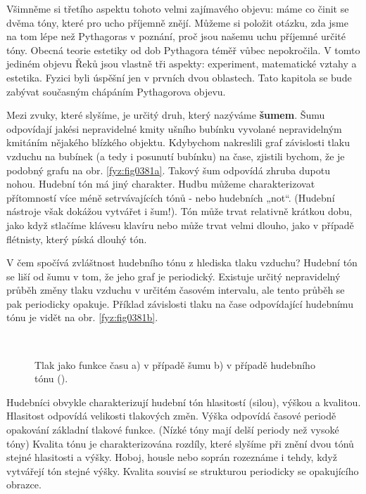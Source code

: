   Všimněme si třetího aspektu tohoto velmi zajímavého objevu: máme co činit se dvěma tóny, které 
  pro ucho příjemně znějí. Můžeme si položit otázku, zda jsme na tom lépe než Pythagoras v 
  poznání, proč jsou našemu uchu příjemné určité tóny. Obecná teorie estetiky od dob Pythagora 
  téměř vůbec nepokročila. V tomto jediném objevu Řeků jsou vlastně tři aspekty: experiment, 
  matematické vztahy a estetika. Fyzici byli úspěšní jen v prvních dvou oblastech. Tato kapitola 
  se bude zabývat současným chápáním Pythagorova objevu. 
    
  Mezi zvuky, které slyšíme, je určitý druh, který nazýváme \textbf{šumem}. Šumu odpovídají 
  jakési nepravidelné kmity ušního bubínku vyvolané nepravidelným kmitáním nějakého blízkého 
  objektu. Kdybychom nakreslili graf závislosti tlaku vzduchu na bubínek (a tedy i posunutí 
  bubínku) na čase, zjistili bychom, že je podobný grafu na obr. \ref{fyz:fig0381a}. Takový šum 
  odpovídá zhruba dupotu nohou. Hudební tón má jiný charakter. Hudbu můžeme charakterizovat 
  přítomností více méně setrvávajících tónů - nebo hudebních „not“. (Hudební nástroje však dokážou 
  vytvářet i šum!). Tón může trvat relativně krátkou dobu, jako když stlačíme klávesu klavíru nebo 
  může trvat velmi dlouho, jako v případě flétnisty, který píská dlouhý tón. 
    
  V čem spočívá zvláštnost hudebního tónu z hlediska tlaku vzduchu? Hudební tón se liší od šumu v 
  tom, že jeho graf je periodický. Existuje určitý nepravidelný průběh změny tlaku vzduchu v 
  určitém časovém intervalu, ale tento průběh se pak periodicky opakuje. Příklad závislosti tlaku 
  na čase odpovídající hudebnímu tónu je vidět na obr. \ref{fyz:fig0381b}.

  \begin{figure}[ht!] %
    \centering
     \\
    \caption{Tlak jako funkce času a) v případě šumu b) v případě hudebního tónu
             (\cite[s.~673]{Feynman01}).}
    \label{fyz:fig0381}
  \end{figure}
  
  Hudebníci obvykle charakterizují hudební tón hlasitostí (silou), výškou a kvalitou. Hlasitost 
  odpovídá velikosti tlakových změn. Výška odpovídá časové periodě opakování základní tlakové 
  funkce. (Nízké tóny mají delší periody než vysoké tóny) Kvalita tónu je charakterizována rozdíly, 
  které slyšíme při znění dvou tónů stejné hlasitosti a výšky. Hoboj, housle nebo soprán rozeznáme 
  i tehdy, když vytvářejí tón stejné výšky. Kvalita souvisí se strukturou periodicky se opakujícího 
  obrazce.
  
